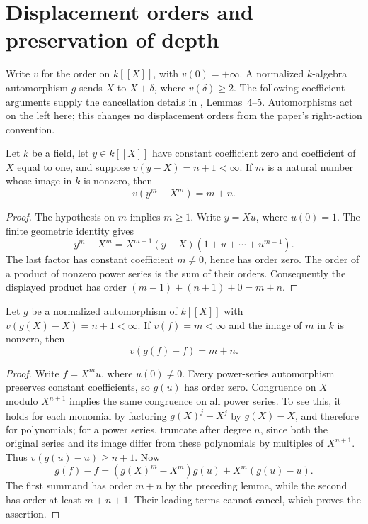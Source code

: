 \section{Displacement orders and preservation of depth}

Write $v$ for the order on $k[[X]]$, with $v(0)=+\infty$.
A normalized $k$-algebra automorphism $g$ sends
$X$ to $X+\delta$, where $v(\delta)\ge2$.
The following coefficient arguments supply the cancellation details in
\cite{Camina1997}, Lemmas~4--5. Automorphisms act on the left here;
this changes no displacement orders from the paper's right-action convention.

\begin{lemma}
\label{lem:normalized-monomial-displacement}
\leanok
Let $k$ be a field, let $y\in k[[X]]$ have constant coefficient zero
and coefficient of $X$ equal to one, and suppose
$v(y-X)=n+1<\infty$. If $m$ is a natural number whose image in $k$
is nonzero, then
\[
 v(y^m-X^m)=m+n.
\]
\end{lemma}

\begin{proof}
The hypothesis on $m$ implies $m\ge1$. Write $y=Xu$, where
$u(0)=1$. The finite geometric identity gives
\[
 y^m-X^m=X^{m-1}(y-X)(1+u+\cdots+u^{m-1}).
\]
The last factor has constant coefficient $m\ne0$, hence has order zero.
The order of a product of nonzero power series is the sum of their orders.
Consequently the displayed product has order
$(m-1)+(n+1)+0=m+n$.
\end{proof}

\begin{lemma}
\label{lem:normalized-leading-displacement}
\leanok
Let $g$ be a normalized automorphism of $k[[X]]$ with
$v(g(X)-X)=n+1<\infty$. If $v(f)=m<\infty$ and the image
of $m$ in $k$ is nonzero, then
\[
 v(g(f)-f)=m+n.
\]
\end{lemma}

\begin{proof}
Write $f=X^m u$, where $u(0)\ne0$. Every power-series automorphism
preserves constant coefficients, so $g(u)$ has order zero.
Congruence on $X$ modulo $X^{n+1}$ implies the same congruence on
all power series. To see this, it holds for each monomial by
factoring $g(X)^j-X^j$ by $g(X)-X$, and therefore for polynomials;
for a power series, truncate after degree $n$, since both the original
series and its image differ from these polynomials by multiples of
$X^{n+1}$. Thus $v(g(u)-u)\ge n+1$.
Now
\[
 g(f)-f=(g(X)^m-X^m)g(u)+X^m(g(u)-u).
\]
The first summand has order $m+n$ by the preceding lemma, while the
second has order at least $m+n+1$. Their leading terms cannot cancel,
which proves the assertion.
\end{proof}

